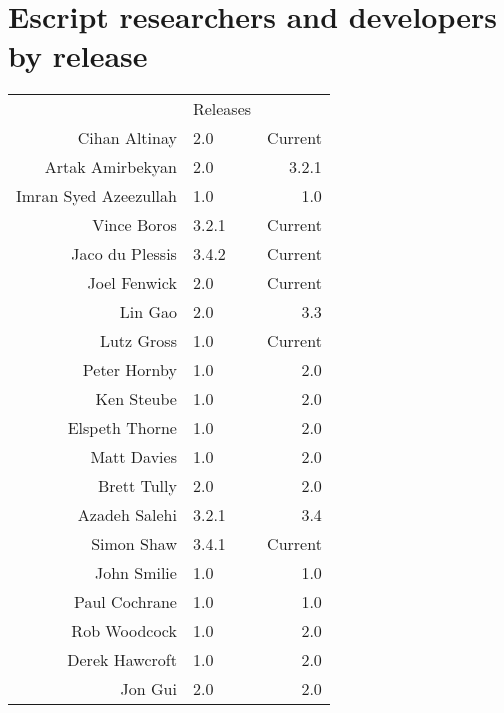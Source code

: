 
\chapter{Escript researchers and developers by release}

\begin{center}
\begin{tabular}{r|lr|}
& Releases\\ \cline{2-3}
Cihan Altinay & 2.0 & Current \\
Artak Amirbekyan & 2.0 & 3.2.1 \\
Imran Syed Azeezullah & 1.0 & 1.0 \\
Vince Boros & 3.2.1 & Current \\
Jaco du Plessis & 3.4.2 & Current \\
Joel Fenwick & 2.0 & Current \\
Lin Gao & 2.0 & 3.3 \\
Lutz Gross & 1.0 & Current \\
Peter Hornby & 1.0 & 2.0 \\
Ken Steube & 1.0 & 2.0 \\
Elspeth Thorne & 1.0 & 2.0 \\
Matt Davies & 1.0 & 2.0 \\
Brett Tully & 2.0 & 2.0 \\
Azadeh Salehi & 3.2.1 & 3.4 \\
Simon Shaw & 3.4.1 & Current \\
John Smilie & 1.0 & 1.0 \\
Paul Cochrane & 1.0 & 1.0 \\
Rob Woodcock & 1.0 & 2.0 \\
Derek Hawcroft & 1.0 & 2.0 \\
Jon Gui & 2.0 & 2.0 \\
\cline{2-3}
\end{tabular}
\end{center}

